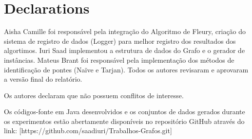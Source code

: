 \documentclass{sbc2023}%
\begin{document}
\section*{Declarations}

\begin{contributions}
Aisha Camille foi responsável pela integração do Algoritmo de Fleury, criação do sistema de registro de dados (Logger) para melhor registro dos resultados dos algortimos. Iuri Saad implementou a estrutura de dados do Grafo e o gerador de instâncias. Mateus Brant foi responsável pela implementação dos métodos de identificação de pontes (Naïve e Tarjan). Todos os autores revisaram e aprovaram a versão final do relatório.
\end{contributions}

\begin{interests}
Os autores declaram que não possuem conflitos de interesse.
\end{interests}


\begin{materials}
Os códigos-fonte em Java desenvolvidos e os conjuntos de dados gerados durante os experimentos estão abertamente disponíveis no repositório GitHub através do link: [https://github.com/saadiuri/Trabalhos-Grafos.git]
\end{materials}




\end{document}
